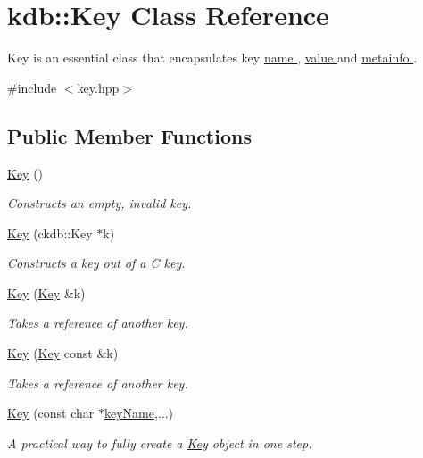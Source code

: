 \hypertarget{classkdb_1_1Key}{\section{kdb\-:\-:Key Class Reference}
\label{classkdb_1_1Key}
}


Key is an essential class that encapsulates key \hyperlink{group__keyname}{name }, \hyperlink{group__keyvalue}{value } and \hyperlink{group__keymeta}{metainfo }.   




{\ttfamily \#include $<$key.\-hpp$>$}

\subsection*{Public Member Functions}
\begin{DoxyCompactItemize}
\item 
\hyperlink{classkdb_1_1Key_a5679f5cae63caddd64a60388b9cc77fa}{Key} ()
\begin{DoxyCompactList}\small\item\em Constructs an empty, invalid key. \end{DoxyCompactList}\item 
\hyperlink{classkdb_1_1Key_a41ada34fa45a270e63444267621b59c9}{Key} (ckdb\-::\-Key $\ast$k)
\begin{DoxyCompactList}\small\item\em Constructs a key out of a C key. \end{DoxyCompactList}\item 
\hyperlink{classkdb_1_1Key_a33f63e153a7d832a54e02c0cba569feb}{Key} (\hyperlink{classkdb_1_1Key}{Key} \&k)
\begin{DoxyCompactList}\small\item\em Takes a reference of another key. \end{DoxyCompactList}\item 
\hyperlink{classkdb_1_1Key_ab68da8be743b2f635ff8e28dfaeaaea6}{Key} (\hyperlink{classkdb_1_1Key}{Key} const \&k)
\begin{DoxyCompactList}\small\item\em Takes a reference of another key. \end{DoxyCompactList}\item 
\hyperlink{classkdb_1_1Key_a15b2e9e1cc323cde05b0d1d3805656e0}{Key} (const char $\ast$\hyperlink{group__keyname_ga8e805c726a60da921d3736cda7813513}{key\-Name},...)
\begin{DoxyCompactList}\small\item\em A practical way to fully create a \hyperlink{classkdb_1_1Key}{Key} object in one step.  \end{DoxyCompactList}\item 

\end{DoxyCompactItemize}
